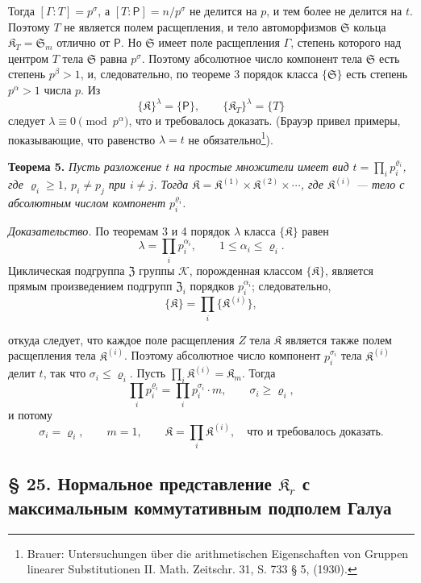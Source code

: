 \documentclass[11pt]{article}
\newcommand{\srcfn}[2]{\footnote{#2}}
\begin{document}
Тогда \([\Gamma:T]=p^\sigma\), а \([T:\mathsf P]=n/p^\sigma\) не делится на \(p\), и тем более не делится на \(t\). Поэтому \(T\) не является полем расщепления, и тело автоморфизмов \(\mathfrak S\) кольца \(\mathfrak K_T=\mathfrak S_m\) отлично от \(\mathsf P\). Но \(\mathfrak S\) имеет поле расщепления \(\Gamma\), степень которого над центром \(T\) тела \(\mathfrak S\) равна \(p^\sigma\). Поэтому абсолютное число компонент тела \(\mathfrak S\) есть степень \(p^\beta>1\), и, следовательно, по теореме 3 порядок класса \(\{\mathfrak S\}\) есть степень \(p^\alpha>1\) числа \(p\). Из
\[
\{\mathfrak K\}^{\lambda}=\{\mathsf P\},
\qquad
\{\mathfrak K_T\}^{\lambda}=\{T\}
\]
следует \(\lambda\equiv0\pmod {p^\alpha}\), что и требовалось доказать. (Брауэр привел примеры, показывающие, что равенство \(\lambda=t\) не обязательно\srcfn{1}{Brauer: Untersuchungen über die arithmetischen Eigenschaften von Gruppen linearer Substitutionen II. Math. Zeitschr. 31, S. 733 § 5, (1930).}).

\textbf{Теорема 5.} \emph{Пусть разложение \(t\) на простые множители имеет вид \(t=\prod_i p_i^{\varrho_i}\), где \(\varrho_i\ge1\), \(p_i\ne p_j\) при \(i\ne j\). Тогда \(\mathfrak K=\mathfrak K^{(1)}\times\mathfrak K^{(2)}\times\cdots\), где \(\mathfrak K^{(i)}\) --- тело с абсолютным числом компонент \(p_i^{\varrho_i}\).}

\emph{Доказательство.} По теоремам 3 и 4 порядок \(\lambda\) класса \(\{\mathfrak K\}\) равен
\[
\lambda=\prod_i p_i^{\alpha_i},\qquad 1\le\alpha_i\le\varrho_i.
\]
Циклическая подгруппа \(\mathfrak Z\) группы \(\mathscr K\), порожденная классом \(\{\mathfrak K\}\), является прямым произведением подгрупп \(\mathfrak Z_i\) порядков \(p_i^{\alpha_i}\); следовательно,
\[
\{\mathfrak K\}=\prod_i\{\mathfrak K^{(i)}\},
\]

откуда следует, что каждое поле расщепления \(Z\) тела \(\mathfrak K\) является также полем расщепления тела \(\mathfrak K^{(i)}\). Поэтому абсолютное число компонент \(p_i^{\sigma_i}\) тела \(\mathfrak K^{(i)}\) делит \(t\), так что \(\sigma_i\le\varrho_i\). Пусть \(\prod_i \mathfrak K^{(i)}=\mathfrak K_m\). Тогда
\[
\prod_i p_i^{\varrho_i}=\prod_i p_i^{\sigma_i}\cdot m,
\qquad
\sigma_i\ge\varrho_i,
\]
и потому
\[
\sigma_i=\varrho_i,\qquad m=1,\qquad
\mathfrak K=\prod_i \mathfrak K^{(i)},
\quad\text{что и требовалось доказать.}
\]

\subsection*{§ 25. Нормальное представление \(\mathfrak K_r\) с максимальным коммутативным подполем Галуа\protect\footnotemark}
\label{normaldarstellung-von-r_r-mit-galoisschem-maximalem-kommutativem-teilkoerper-1}
\end{document}
